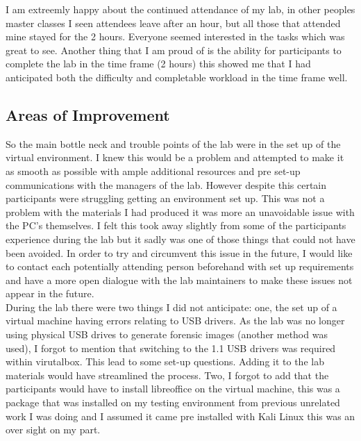 \documentclass[a4paper,11pt]{article}
\begin{document}
I am extreemly happy about the continued attendance of my lab, in other peoples master classes I seen attendees leave after an hour, but all those that attended mine stayed for the 2 hours. Everyone seemed interested in the tasks which was great to see. Another thing that I am proud of is the ability for participants to complete the lab in the time frame (2 hours) this showed me that I had anticipated both the difficulty and completable workload in the time frame well.

\subsection{Areas of Improvement}
So the main bottle neck and trouble points of the lab were in the set up of the virtual environment. I knew this would be a problem and attempted to make it as smooth as possible with ample additional resources and pre set-up communications with the managers of the lab. However despite this certain participants were struggling getting an environment set up. This was not a problem with the materials I had produced it was more an unavoidable issue with the PC's themselves. I felt this took away slightly from some of the participants experience during the lab but it sadly was one of those things that could not have been avoided. In order to try and circumvent this issue in the future, I would like to contact each potentially attending person beforehand with set up requirements and have a more open dialogue with the lab maintainers to make these issues not appear in the future.\\

During the lab there were two things I did not anticipate: one, the set up of a virtual machine having errors relating to USB drivers. As the lab was no longer using physical USB drives to generate forensic images (another method was used), I forgot to mention that switching to the 1.1 USB drivers was required within virutalbox. This lead to some set-up questions.  Adding it to the lab materials would have streamlined the process. Two, I forgot to add that the participants would have to install libreoffice on the virtual machine, this was a package that was installed on my testing environment from previous unrelated work I was doing and I assumed it came pre installed with Kali Linux this was an over sight on my part.
 
\end{document}
